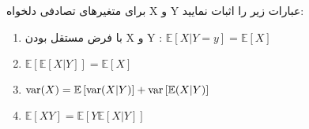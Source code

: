 برای متغیرهای تصادفی دلخواه X و Y عبارات زیر را اثبات نمایید:

\begin{enumerate}[label=(\alph*)]
	\item
	با فرض مستقل بودن X و Y :  
	$
	\mathbb{E}\left[ {X|Y = y} \right] = \mathbb{E}\left[ X \right]
	$
	
	\item
	$
	\mathbb{E}\left[ {\mathbb{E}\left[ {X|Y} \right]} \right] = \mathbb{E}\left[ X \right]
	$
	
	\item
	$
	{\mathop{\rm var}} (X) = \mathbb{E}\left[ {{\mathop{\rm var}} (X|Y)} \right] + {\mathop{\rm var}} \left[ {\mathbb{E}(X|Y)} \right]
	$
	
	\item
	$
	\mathbb{E}\left[ {XY} \right] = \mathbb{E}\left[ {Y\mathbb{E}\left[ {X|Y} \right]} \right]
	$
\end{enumerate}